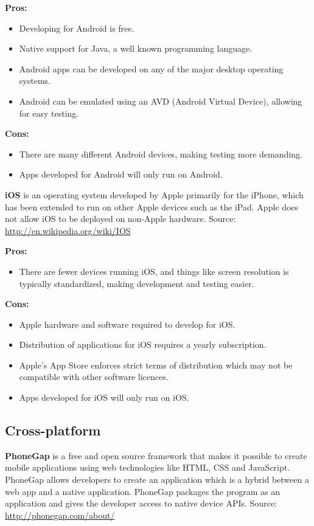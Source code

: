\indent
  {\bf Pros:}
  \begin{itemize}
    \item Developing for Android is free.
    \item Native support for Java, a well known programming language.
    \item Android apps can be developed on any of the major desktop operating
          systems.
    \item Android can be emulated using an AVD (Android Virtual Device),
          allowing for easy testing.
  \end{itemize}

\indent
  {\bf Cons:}
  \begin{itemize}
    \item There are many different Android devices, making testing more
          demanding.
    \item Apps developed for Android will only run on Android.
  \end{itemize}

\noindent
{\bf iOS} is an operating system developed by Apple primarily for the iPhone,
which has been extended to run on other Apple devices such as the iPad. Apple
does not allow iOS to be deployed on non-Apple hardware.
Source: \url{http://en.wikipedia.org/wiki/IOS}

\indent
  {\bf Pros:}
  \begin{itemize}
    \item There are fewer devices running iOS, and things like screen
          resolution is typically standardized, making development and testing
          easier.
  \end{itemize}

\indent
  {\bf Cons:}
  \begin{itemize}
    \item Apple hardware and software required to develop for iOS.
    \item Distribution of applications for iOS requires a yearly subscription.
    \item Apple's App Store enforces strict terms of distribution which may not
          be compatible with other software licences.
    \item Apps developed for iOS will only run on iOS.
  \end{itemize}


\subsection{Cross-platform}
    {\bf PhoneGap} is a free and open source framework that makes it possible
    to create mobile applications using web technologies like HTML, CSS and
    JavaScript. PhoneGap allows developers to create an application which is a
    hybrid between a web app and a native application. PhoneGap packages the
    program as an application and gives the developer access to native device APIs.
    Source: \url{http://phonegap.com/about/}

